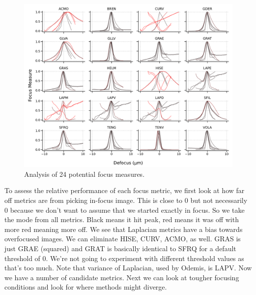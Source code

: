 \begin{figure}[!tbh]
    \centering
    \includegraphics[width=\linewidth]{cppendix-A/figures/fig3_metrics_v1.pdf}
    \caption{Analysis of 24 potential focus measures.}
    \label{fig:A.3_metrics}
\end{figure}

To assess the relative performance of each focus metric, we first look at how far off metrics are from picking in-focus image. This is close to 0 but not necessarily 0 because we don't want to assume that we started exactly in focus. So we take the mode from all metrics. Black means it hit peak, red means it was off with more red meaning more off. We see that Laplacian metrics have a bias towards overfocused images. We can eliminate HISE, CURV, ACMO, as well. GRAS is just GRAE (squared) and GRAT is basically identical to SFRQ for a default threshold of 0. We're not going to experiment with different threshold values as that's too much. Note that variance of Laplacian, used by Odemis, is LAPV. Now we have a number of candidate metrics. Next we can look at tougher focusing conditions and look for where methods might diverge.



